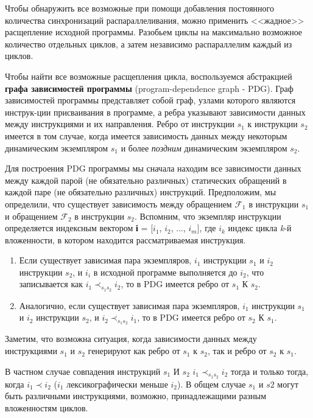 
Чтобы обнаружить все возможные при помощи добавления постоянного количества синхронизаций распараллеливания, можно применить <<жадное>> расщепление исходной программы. Разобьем циклы на максимально возможное количество отдельных циклов, а затем независимо распараллелим каждый из циклов.

Чтобы найти все возможные расщепления цикла, воспользуемся абстракцией \textbf{графа зависимостей программы} (program-dependence graph - PDG). Граф зависимостей программы представляет собой граф, узлами которого являются инструк-ции присваивания в программе, а ребра указывают зависимости данных между инструкциями и их направления. Ребро от инструкции $s_{1}$ к инструкции $s_{2}$ имеется в том случае, когда имеется зависимость данных между некоторым динамическим экземпляром $s_{1}$ и более \textit{поздним} динамическим экземпляром $s_{2}$.


Для построения PDG программы мы сначала находим все зависимости данных между каждой парой (не обязательно различных) статических обращений в каждой паре (не обязательно различных) инструкций. Предположим, мы определили, что существует зависимость между обращением $\mathcal{F}_{1}$ в инструкции $s_{1}$ и обращением $\mathcal{F}_{2}$ в инструкции $s_{2}$. Вспомним, что экземпляр инструкции определяется индексным вектором \textbf{і} = [$i_{1}$, $i_{2}$, ..., $i_{m}$], где $i_{k}$ индекс цикла \textit{k}-й вложенности, в котором находится рассматриваемая инструкция.
\begin{enumerate}
    \item Если существует зависимая пара экземпляров, $i_{1}$ инструкции $s_{1}$ и $i_{2}$ инструкции $s_{2}$, и $i_{i}$ в исходной программе выполняется до $i_{2}$, что записывается как $i_{1}\prec _{s_{1}s_{2}}i_{2}$, то в PDG имеется ребро от $s_{1}$ К $s_{2}$.
    
    \item Аналогично, если существует зависимая пара экземпляров, $i_{1}$ инструкции $s_{1}$ и $i_{2}$ инструкции $s_{2}$, и $i_{2}\prec _{s_{1}s_{2}}i_{1}$, то в PDG имеется ребро от $s_{2}$ К $s_{1}$.
\end{enumerate}
 
Заметим, что возможна ситуация, когда зависимости данных между инструкциями $s_{1}$ и $s_{2}$ генерируют как ребро от $s_{1}$ к $s_{2}$, так и ребро от $s_{2}$ к $s_{1}$.

В частном случае совпадения инструкций $s_{1}$ И $s_{2}$ $i_{1}\prec _{s_{1}s_{2}}i_{2}$ тогда и только тогда, когда $i_{1}\prec i_{2}$ ($i_{1}$ лексикографически меньше $i_{2}$). В общем случае $s_{1}$ и $s{2}$ могут быть различными инструкциями, возможно, принадлежащими разным вложенностям циклов.

